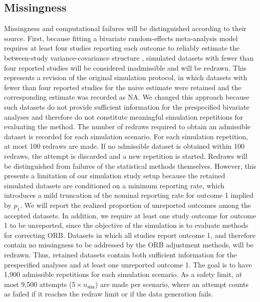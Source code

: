 \documentclass[11pt]{article}
\begin{document}
\subsection{Missingness}
Missingness and computational failures will be distinguished according to their source. First, because fitting a bivariate random-effects meta-analysis model requires at least four studies reporting each outcome to reliably estimate the between-study variance-covariance structure \cite{macaskill2010cochrane}, simulated datasets with fewer than four reported studies will be considered inadmissible and will be redrawn. This represents a revision of the original simulation protocol, in which datasets with fewer than four reported studies for the naive estimate were retained and the corresponding estimate was recorded as NA. We changed this approach because such datasets do not provide sufficient information for the prespecified bivariate analyses and therefore do not constitute meaningful simulation repetitions for evaluating the method. The number of redraws required to obtain an admissible dataset is recorded for each simulation scenario. For each simulation repetition, at most 100 redraws are made. If no admissible dataset is obtained within 100 redraws, the attempt is discarded and a new repetition is started. Redraws will be distinguished from failures of the statistical methods themselves. However, this presents a limitation of our simulation study setup because the retained simulated datasets are conditioned on a minimum reporting rate, which introduces a mild truncation of the nominal reporting rate for outcome 1 implied by $p_1$. We will report the realized proportion of unreported outcomes among the accepted datasets. In addition, we require at least one study outcome for outcome 1 to be unreported, since the objective of the simulation is to evaluate methods for correcting ORB. Datasets in which all studies report outcome 1, and therefore contain no missingness to be addressed by the ORB adjustment methods, will be redrawn. Thus, retained datasets contain both sufficient information for the prespecified analyses and at least one unreported outcome 1. The goal is to have 1,900 admissible repetitions for each simulation scenario. As a safety limit, at most 9,500 attempts ($5 \times n_{\text{sim}}$) are made per scenario, where an attempt counts as failed if it reaches the redraw limit or if the data generation fails. 
\end{document}

